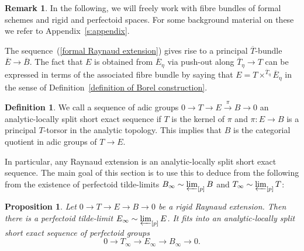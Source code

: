 \documentclass[10pt,oneside]{amsart}
\newtheorem{proposition}[theorem]{Proposition}
\theoremstyle{definition}
\newtheorem{definition}[theorem]{Definition}
\newtheorem{remark}[theorem]{Remark}
\begin{document}
	
	\begin{remark}
	In the following, we will freely work with fibre bundles of formal schemes and rigid and perfectoid spaces. For some background material on these we refer to Appendix~\ref{s:appendix}.
	\end{remark}
	
	The sequence~(\ref{formal Raynaud extension}) gives rise to a principal $\overline{T}$-bundle
	$\overline{E}\rightarrow \overline{B}$. The fact that $E$ is obtained from $\overline{E}_\eta$ via push-out along $\overline{T}_\eta\rightarrow T$ can be expressed in terms of the associated fibre bundle by saying that $E = T\times^{\overline{T}_\eta}\overline{E}_\eta$ in the sense of Definition~\ref{definition of Borel construction}.
	\begin{definition}
		We call a sequence of adic groups $0\to T\to E\xrightarrow{\pi} B\to 0$ an analytic-locally split short exact sequence if $T$ is the kernel of $\pi$ and $\pi:E\to B$ is a principal $T$-torsor in the analytic topology. This implies that $B$ is the categorial quotient in adic groups of $T\to E$.
	\end{definition}
	In particular, any Raynaud extension is an analytic-locally split short exact sequence. The main goal of this section is to use this to deduce from the following from the existence of perfectoid tilde-limits $B_\infty\sim \varprojlim_{[p]}B$ and $T_\infty\sim \varprojlim_{[p]}T$:
	\begin{proposition}\label{p-F-formal tower exists for E}
		Let $0\to T\to E\to B\to 0$ be a rigid Raynaud extension. Then there is a perfectoid tilde-limit $E_\infty\sim \varprojlim_{[p]}E$. It fits into an analytic-locally split short exact sequence of perfectoid groups 
		\[0\to T_\infty\to E_\infty\to B_\infty\to 0.\]
	\end{proposition}
	
\end{document}
